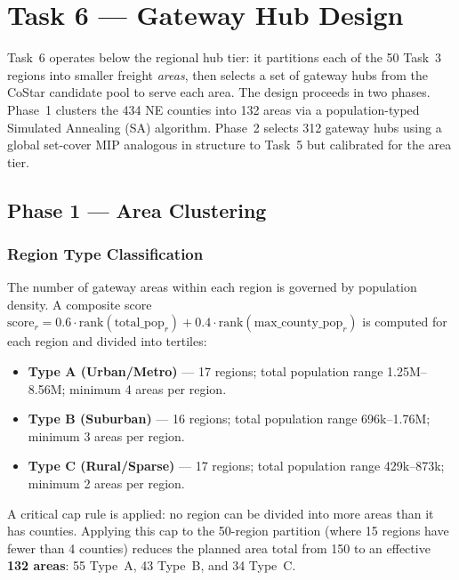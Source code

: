 
\section{Task 6 — Gateway Hub Design}

Task~6 operates below the regional hub tier: it partitions each of the 50 Task~3 regions
into smaller freight \emph{areas}, then selects a set of gateway hubs from the CoStar
candidate pool to serve each area. The design proceeds in two phases. Phase~1 clusters
the 434 NE counties into 132 areas via a population-typed Simulated Annealing (SA)
algorithm. Phase~2 selects 312 gateway hubs using a global set-cover MIP analogous in
structure to Task~5 but calibrated for the area tier.

\subsection{Phase 1 — Area Clustering}

\subsubsection{Region Type Classification}

The number of gateway areas within each region is governed by population density. A
composite score $\text{score}_r = 0.6 \cdot \text{rank}(\text{total\_pop}_r) +
0.4 \cdot \text{rank}(\text{max\_county\_pop}_r)$ is computed for each region and
divided into tertiles:

\begin{itemize}
  \item \textbf{Type A (Urban/Metro)} — 17 regions; total population range
        1.25M--8.56M; minimum 4 areas per region.
  \item \textbf{Type B (Suburban)} — 16 regions; total population range
        696k--1.76M; minimum 3 areas per region.
  \item \textbf{Type C (Rural/Sparse)} — 17 regions; total population range
        429k--873k; minimum 2 areas per region.
\end{itemize}

A critical cap rule is applied: no region can be divided into more areas than it has
counties. Applying this cap to the 50-region partition (where 15 regions have fewer than
4 counties) reduces the planned area total from 150 to an effective \textbf{132 areas}:
55 Type~A, 43 Type~B, and 34 Type~C.

